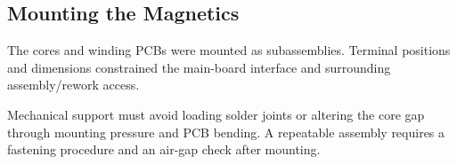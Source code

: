 \subsection{Mounting the Magnetics}
\label{sec:mag-mounting}

The cores and winding PCBs were mounted as subassemblies. Terminal positions and dimensions constrained the main-board interface and surrounding assembly/rework access.

Mechanical support must avoid loading solder joints or altering the core gap through mounting pressure and PCB bending. A repeatable assembly requires a fastening procedure and an air-gap check after mounting.
